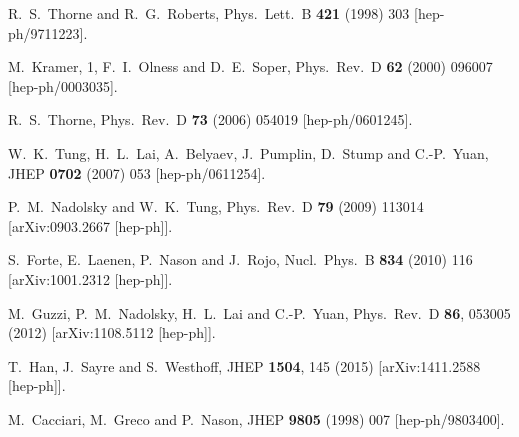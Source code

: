 \documentclass[letter,11pt]{article}
\begin{document}
\begin{thebibliography}{99}
  R.~S.~Thorne and R.~G.~Roberts,
  Phys.\ Lett.\ B {\bf 421} (1998) 303
  [hep-ph/9711223].

  M.~Kramer, 1, F.~I.~Olness and D.~E.~Soper,
  Phys.\ Rev.\ D {\bf 62} (2000) 096007
  [hep-ph/0003035].

  R.~S.~Thorne,
  Phys.\ Rev.\ D {\bf 73} (2006) 054019
  [hep-ph/0601245].

  W.~K.~Tung, H.~L.~Lai, A.~Belyaev, J.~Pumplin, D.~Stump and C.-P.~Yuan,
  JHEP {\bf 0702} (2007) 053
  [hep-ph/0611254].

  P.~M.~Nadolsky and W.~K.~Tung,
  Phys.\ Rev.\ D {\bf 79} (2009) 113014
  [arXiv:0903.2667 [hep-ph]].

  S.~Forte, E.~Laenen, P.~Nason and J.~Rojo,
  Nucl.\ Phys.\ B {\bf 834} (2010) 116
  [arXiv:1001.2312 [hep-ph]].

  M.~Guzzi, P.~M.~Nadolsky, H.~L.~Lai and C.-P.~Yuan,
  Phys.\ Rev.\ D {\bf 86}, 053005 (2012)
  [arXiv:1108.5112 [hep-ph]].
  
  T.~Han, J.~Sayre and S.~Westhoff,
  JHEP {\bf 1504}, 145 (2015)
  [arXiv:1411.2588 [hep-ph]].

  M.~Cacciari, M.~Greco and P.~Nason,
  JHEP {\bf 9805} (1998) 007
  [hep-ph/9803400].


\end{thebibliography}
\end{document}
